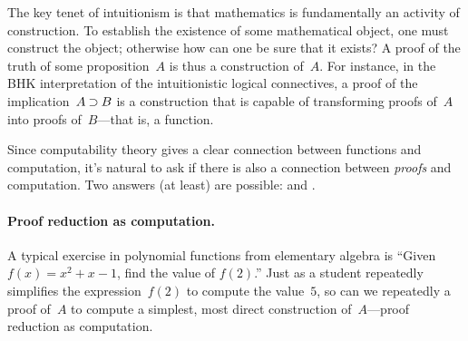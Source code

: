 The key tenet of intuitionism
is that mathematics is fundamentally an activity of construction.
To establish the existence of some mathematical object, one must construct the object; otherwise how can one be sure that it exists?
A proof of the truth of some proposition~$A$ is thus a construction of~$A$.
%
%
For instance, in the \acf{BHK} interpretation of the intuitionistic logical connectives, a proof of the implication~$A \mathbin{\supset} B$ is a construction that is capable of transforming proofs of~$A$ into proofs of~$B$---that is, a function.

Since computability theory gives a clear connection between functions and computation,
it's natural to ask if there is also a connection between \emph{proofs} and computation.
Two answers (at least) are possible:  and .


\paragraph*{Proof reduction as computation.}
A typical exercise in polynomial functions from elementary algebra is \enquote{Given $f(x) = x^2 + x - 1$, find the value of $f(2)$.}
Just as a student repeatedly simplifies the expression~$f(2)$ to compute the value~$5$, so can we repeatedly  a proof of~$A$ to compute a simplest, most direct construction of~$A$---proof reduction as computation.  

